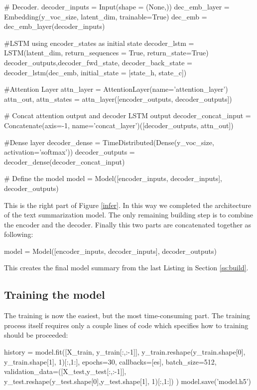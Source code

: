 \begin{python}[caption={Decoder in Python}]
# Decoder. 
decoder_inputs = Input(shape = (None,)) 
dec_emb_layer = Embedding(y_voc_size, latent_dim, trainable=True) 
dec_emb = dec_emb_layer(decoder_inputs) 

#LSTM using encoder_states as initial state
decoder_lstm = LSTM(latent_dim, return_sequences = True, return_state=True) 
decoder_outputs,decoder_fwd_state, decoder_back_state = decoder_lstm(dec_emb, initial_state = [state_h, state_c]) 

#Attention Layer
attn_layer = AttentionLayer(name='attention_layer') 
attn_out, attn_states = attn_layer([encoder_outputs, decoder_outputs]) 

# Concat attention output and decoder LSTM output 
decoder_concat_input = Concatenate(axis=-1, name='concat_layer')([decoder_outputs, attn_out])

#Dense layer
decoder_dense = TimeDistributed(Dense(y_voc_size, activation='softmax')) 
decoder_outputs = decoder_dense(decoder_concat_input) 

# Define the model
model = Model([encoder_inputs, decoder_inputs], decoder_outputs) 
\end{python}

This is the right part of Figure \ref{infer}. In this way we completed the architecture of the text summarization model. The only remaining building step is to combine the encoder and the decoder. Finally this two parts are concatenated together as following:

\begin{python}[caption={Concatenation of Encoder and Decoder}]
	model = Model([encoder_inputs, decoder_inputs], decoder_outputs) 
\end{python}

This creates the final model summary from the last Listing in Section \ref{ss:build}. 

\subsection{Training the model}

The training is now the easiest, but the most time-consuming part. The training process itself requires only a couple lines of code which specifies how to training should be proceeded:

\begin{python}[caption={Fitting process for the concatenated model}]
	history = model.fit([X_train, y_train[:,:-1]], 
	y_train.reshape(y_train.shape[0], y_train.shape[1], 1)[:,1:],
			epochs=30,
			callbacks=[es],
			batch_size=512, 
			validation_data=([X_test,y_test[:,:-1]],
					y_test.reshape(y_test.shape[0],y_test.shape[1], 1)[:,1:])
	)
	model.save('model.h5')
\end{python}

